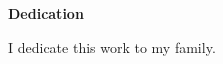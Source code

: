 
\newpage
\vspace*{0.9cm}
\begin{center}
{\bf \Huge Dedication}
\end{center}

\setlength{\baselineskip}{0.8cm}



I dedicate this work to my family.
